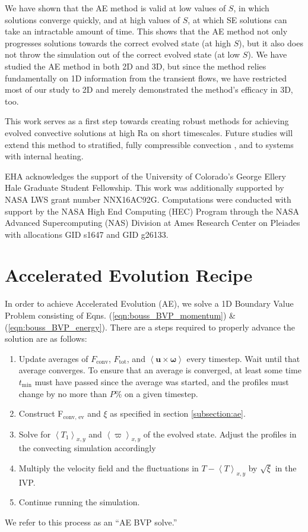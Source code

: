 \documentclass[aps, pre, onecolumn, nofootinbib, notitlepage, groupedaddress, amsfonts, amssymb, amsmath, longbibliography]{revtex4-1}
\newcommand{\angles}[1]{\ensuremath{\left\langle #1 \right\rangle}}
\begin{document}
We have shown that the AE method is valid at low values of $S$, in which solutions
converge quickly, and at high values of $S$, at which SE solutions can take an
intractable amount of time.  This shows that the AE method not only progresses
solutions towards the correct evolved state (at high $S$), but it also does not
throw the simulation out of the correct evolved state (at low $S$).  We have studied
the AE method in both 2D and 3D, but since the method relies fundamentally on
1D information from the transient flows, we have restricted most of our study
to 2D and merely demonstrated the method's efficacy in 3D, too.

This work serves as a first step towards creating robust methods for
achieving evolved convective solutions at high Ra on short timescales.
Future studies will extend this method to stratified, fully compressible
convection \cite{anders&brown2017}, and to systems with internal heating.


\begin{acknowledgments}
EHA acknowledges the support of the University of Colorado's George 
Ellery Hale Graduate Student Fellowship.
This work was additionally supported by  NASA LWS grant number NNX16AC92G.  
Computations were conducted 
with support by the NASA High End Computing (HEC) Program through the NASA 
Advanced Supercomputing (NAS) Division at Ames Research Center on Pleiades
with allocations GID s1647 and GID g26133.
\end{acknowledgments}


\appendix
\section{Accelerated Evolution Recipe}
\label{appendix:recipe}
In order to achieve Accelerated Evolution (AE), we solve a 1D Boundary Value Problem
consisting of Eqns. (\ref{eqn:bouss_BVP_momentum}) \& (\ref{eqn:bouss_BVP_energy}).
There are a steps required to properly advance the solution are as follows:
\begin{enumerate}
\item Update averages of $F_{\text{conv}}$, $F_{\text{tot}}$, and $\angles{\bm{u} \times \bm{\omega}}$
every timestep.  Wait until that average converges. To ensure that an average is converged, at
least some time $t_{\text{min}}$ must have passed since the average was started, and
the profiles must change by no more than $P$\% on a given timestep.
\item Construct F$_\text{conv, ev}$ and $\xi$ as specified in section \ref{subsection:ae}.
\item Solve for $\angles{T_1}_{x,y}$ and $\angles{\varpi}_{x,y}$ of the
evolved state.  Adjust the profiles in the convecting simulation accordingly
\item Multiply the velocity field and the fluctuations in $T - \angles{T}_{x,y}$ by $\sqrt{\xi}$ in the IVP. 
\item Continue running the simulation.
\end{enumerate}
We refer to this process as an ``AE BVP solve.''
\end{document}
